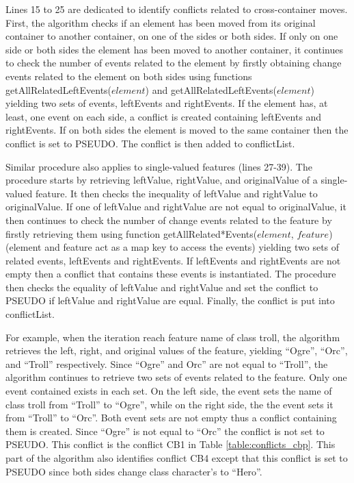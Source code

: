 Lines 15 to 25 are dedicated to identify conflicts related to cross-container moves. First, the algorithm checks if an element has been moved from its original container to another container, on one of the sides or both sides. If only on one side or both sides the element has been moved to another container, it continues to check the number of events related to the element by firstly obtaining change events related to the element on both sides using functions \textsf{getAllRelatedLeftEvents($element$)} and \textsf{getAllRelatedLeftEvents($element$)} yielding two sets of events, \textsf{leftEvents} and \textsf{rightEvents}. If the element has, at least, one event on each side, a conflict is created containing \textsf{leftEvents} and \textsf{rightEvents}. If on both sides the element is moved to the same container then the conflict is set to \textsf{PSEUDO}. The conflict is then added to \textsf{conflictList}. 

Similar procedure also applies to single-valued features (lines 27-39). The procedure starts by retrieving \textsf{leftValue}, \textsf{rightValue}, and \textsf{originalValue} of a single-valued feature. It then checks the inequality of \textsf{leftValue} and \textsf{rightValue} to \textsf{originalValue}. If one of \textsf{leftValue} and \textsf{rightValue} are not equal to \textsf{originalValue}, it then continues to check the number of change events related to the feature by firstly retrieving them using function \textsf{getAllRelated*Events($element$, $feature$)} (element and feature act as a map key to access the events) yielding two sets of related events, \textsf{leftEvents} and \textsf{rightEvents}. If \textsf{leftEvents} and \textsf{rightEvents} are not empty then a conflict that contains these events is instantiated. The procedure then checks the equality of \textsf{leftValue} and \textsf{rightValue} and set the conflict to \textsf{PSEUDO} if \textsf{leftValue} and \textsf{rightValue} are equal. Finally, the conflict is put into \textsf{conflictList}. 

For example, when the iteration reach feature \textsf{name} of class \textsf{troll}, the algorithm retrieves the left, right, and original values of the feature, yielding ``Ogre'', ``Orc'', and ``Troll'' respectively. Since ``Ogre'' and Orc'' are not equal to ``Troll'', the algorithm continues to retrieve two sets of events related to the feature. Only one event contained exists in each set. On the left side, the event sets the name of class \textsf{troll} from ``Troll'' to ``Ogre'', while on the right side, the the event sets it from ``Troll'' to ``Orc''. Both event sets are not empty thus a conflict containing them is created. Since ``Ogre'' is not equal to ``Orc'' the conflict is not set to \textsf{PSEUDO}. This conflict is the conflict \textsf{CB1} in Table \ref{table:conflicts_cbp}. This part of the algorithm also identifies conflict \textsf{CB4} except that this conflict is set to \textsf{PSEUDO} since both sides change class \textsf{character}'s  to ``Hero''.   

